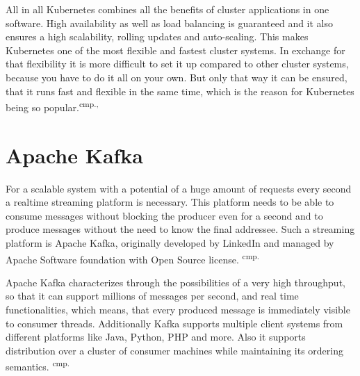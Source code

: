 
All in all Kubernetes combines all the benefits of cluster applications in one software. High availability as well as load balancing is guaranteed and it also ensures a high scalability, rolling updates and auto-scaling. This makes Kubernetes one of the most flexible and fastest cluster systems. In exchange for that flexibility it is more difficult to set it up compared to other cluster systems, because you have to do it all on your own. But only that way it can be ensured, that it runs fast and flexible in the same time, which is the reason for Kubernetes being so popular.\textsuperscript{cmp.\cite{24}, \cite{25}}


\section{Apache Kafka}

For a scalable system with a potential of a huge amount of requests every second a realtime streaming platform is necessary. This platform needs to be able to consume messages without blocking the producer even for a second and to produce messages without the need to know the final addressee. Such a streaming platform is Apache Kafka, originally developed by LinkedIn and managed by Apache Software foundation with Open Source license. \textsuperscript{cmp.\cite{26}}


Apache Kafka characterizes through the possibilities of a very high throughput, so that it can support millions of messages per second, and real time functionalities, which means, that every produced message is immediately visible to consumer threads. Additionally Kafka supports multiple client systems from different platforms like Java, Python, PHP and more. Also it supports distribution over a cluster of consumer machines while maintaining its ordering semantics. \textsuperscript{cmp.\cite{26}}


